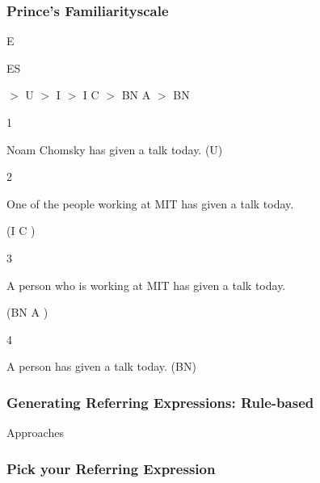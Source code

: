 \documentclass[compress,color=usenames]{beamer}
\begin{document}
\begin{frame}
\frametitle{
Prince's Familiarityscale}






E



ES






$>$ U $>$ I $>$ I C $>$ BN A $>$ BN





1






Noam Chomsky has given a talk today. (U)





2






One of the people working at MIT has given a talk today.



(I C )





3






A person who is working at MIT has given a talk today.



(BN A )





4






A person has given a talk today. (BN)










\end{frame}
\begin{frame}
\frametitle{
Generating Referring Expressions: Rule-based}



Approaches










\end{frame}
\begin{frame}
\frametitle{
Pick your Referring Expression}










\end{frame}
\end{document}
